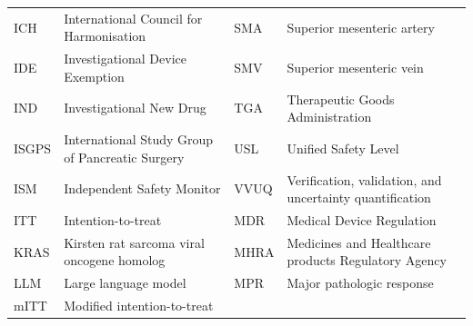 \begin{table}[htbp]
\begin{tabularx}{\textwidth}{L{1.3cm} L{6.8cm} L{1.3cm} L{6.2cm}}
ICH    & International Council for Harmonisation         & SMA   & Superior mesenteric artery \\
IDE    & Investigational Device Exemption                & SMV   & Superior mesenteric vein \\
IND    & Investigational New Drug                        & TGA   & Therapeutic Goods Administration \\
ISGPS  & International Study Group of Pancreatic Surgery & USL   & Unified Safety Level \\
ISM    & Independent Safety Monitor                      & VVUQ  & Verification, validation, and uncertainty quantification \\
ITT    & Intention-to-treat                              & MDR   & Medical Device Regulation \\
KRAS   & Kirsten rat sarcoma viral oncogene homolog      & MHRA  & Medicines and Healthcare products Regulatory Agency \\
LLM    & Large language model                            & MPR   & Major pathologic response \\
mITT   & Modified intention-to-treat                     &       & \\
\bottomrule
\end{tabularx}
\end{table}
